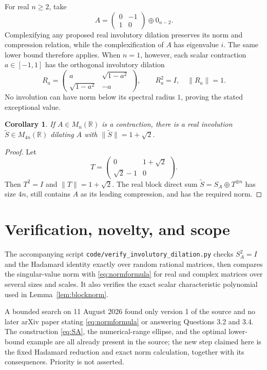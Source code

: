 \documentclass[11pt]{article}
\newtheorem{corollary}{Corollary}
\newcommand{\R}{\mathbb R}
\begin{document}
For real \(n\ge2\), take
\[
 A=\begin{pmatrix}0&-1\\1&0\end{pmatrix}\oplus0_{n-2}.
\]
Complexifying any proposed real involutory dilation preserves its norm and
compression relation, while the complexification of \(A\) has eigenvalue
\(i\).  The same lower bound therefore applies.  When \(n=1\), however,
each scalar contraction \(a\in[-1,1]\) has the orthogonal involutory
dilation
\[
 R_a=\begin{pmatrix}a&\sqrt{1-a^2}\\
          \sqrt{1-a^2}&-a\end{pmatrix},
 \qquad R_a^2=I,\quad \|R_a\|=1.
\]
No involution can have norm below its spectral radius \(1\), proving the
stated exceptional value.

\begin{corollary}\label{cor:real4n}
If \(A\in M_n(\R)\) is a contraction, there is a real involution
\(\widetilde S\in M_{4n}(\R)\) dilating \(A\) with
\(\|\widetilde S\|=1+\sqrt2\).
\end{corollary}

\begin{proof}
Let
\[
 T=\begin{pmatrix}0&1+\sqrt2\\\sqrt2-1&0\end{pmatrix}.
\]
Then \(T^2=I\) and \(\|T\|=1+\sqrt2\).  The real block direct sum
\(\widetilde S=S_A\oplus T^{\oplus n}\) has size \(4n\), still contains
\(A\) as its leading compression, and has the required norm.
\end{proof}

\section{Verification, novelty, and scope}

The accompanying script \texttt{code/verify\_involutory\_dilation.py}
checks \(S_A^2=I\) and the Hadamard identity exactly over random rational
matrices, then compares the singular-value norm with
\eqref{eq:normformula} for real and complex matrices over several sizes and
scales.  It also verifies the exact scalar characteristic polynomial used
in Lemma~\ref{lem:blocknorm}.

A bounded search on 11 August 2026 found only version 1 of the source and no
later arXiv paper stating \eqref{eq:normformula} or answering Questions 3.2
and 3.4.  The construction \eqref{eq:SA}, the numerical-range ellipse, and
the optimal lower-bound example are all already present in the source; the
new step claimed here is the fixed Hadamard reduction and exact norm
calculation, together with its consequences.  Priority is not asserted.
\end{document}
